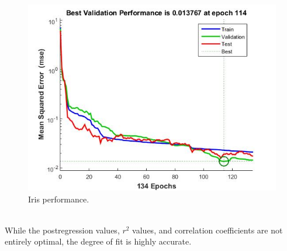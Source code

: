 \documentclass{article}%
\begin{document}
\begin{figure}[H]
\centering
\includegraphics[scale=0.5]{Iris/performance.jpg}
\caption{Iris performance.}
\label{fig:iristrain}
\end{figure}
\\
While the postregression values, $r^2$ values, and correlation coefficients are not entirely optimal, the degree of fit is highly accurate.
\end{document}
